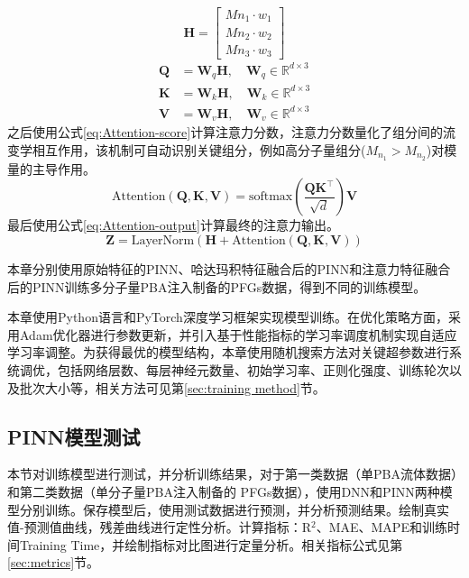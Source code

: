 \begin{equation}
  \mathbf{H} =
  \begin{bmatrix}
    Mn_{1} \cdot w_1 \\
    Mn_{2} \cdot w_2 \\
    Mn_{3} \cdot w_3
  \end{bmatrix} \label{eq:Mn-w-hadamard-slice}
\end{equation}
\begin{align}
  \mathbf{Q} & = \mathbf{W}_q \mathbf{H}, \quad \mathbf{W}_q \in \mathbb{R}^{d \times 3}  \label{eq:Attention-Q} \\
  \mathbf{K} & = \mathbf{W}_k \mathbf{H}, \quad \mathbf{W}_k \in \mathbb{R}^{d \times 3} \label{eq:Attention-K}  \\
  \mathbf{V} & = \mathbf{W}_v \mathbf{H}, \quad \mathbf{W}_v \in \mathbb{R}^{d \times 3} \label{eq:Attention-V}
\end{align}
之后使用公式\eqref{eq:Attention-score}计算注意力分数，注意力分数量化了组分间的流变学相互作用，该机制可自动识别关键组分，例如高分子量组分($M_{n_1} > M_{n_2}$)对模量的主导作用。
\begin{equation}
  \text{Attention}(\mathbf{Q}, \mathbf{K}, \mathbf{V}) = \text{softmax}\left(\frac{\mathbf{Q} \mathbf{K}^\top}{\sqrt{d}}\right) \mathbf{V} \label{eq:Attention-score}
\end{equation}
最后使用公式\eqref{eq:Attention-output}计算最终的注意力输出。
\begin{equation}
  \mathbf{Z} = \text{LayerNorm}(\mathbf{H} + \text{Attention}(\mathbf{Q}, \mathbf{K}, \mathbf{V}))
  \label{eq:Attention-output}
\end{equation}

本章分别使用原始特征的PINN、哈达玛积特征融合后的PINN和注意力特征融合后的PINN训练多分子量PBA注入制备的PFGs数据，得到不同的训练模型。

本章使用Python语言和PyTorch深度学习框架实现模型训练。在优化策略方面，采用Adam优化器进行参数更新，并引入基于性能指标的学习率调度机制实现自适应学习率调整。为获得最优的模型结构，本章使用随机搜索方法对关键超参数进行系统调优，包括网络层数、每层神经元数量、初始学习率、正则化强度、训练轮次以及批次大小等，相关方法可见第\ref{sec:training method}节。

\subsection{PINN模型测试}
本节对训练模型进行测试，并分析训练结果，对于第一类数据（单PBA流体数据）和第二类数据（单分子量PBA注入制备的 PFGs数据），使用DNN和PINN两种模型分别训练。保存模型后，使用测试数据进行预测，并分析预测结果。绘制真实值-预测值曲线，残差曲线进行定性分析。计算指标：R$^2$、MAE、MAPE和训练时间Training Time，并绘制指标对比图进行定量分析。相关指标公式见第\ref{sec:metrics}节。

